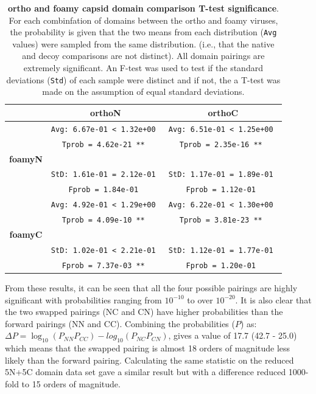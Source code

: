 \documentclass[12pt]{article}
\newcommand{\3}{$3_{10}$}
\begin{document}
\begin{table}
\centering
\begin{tabular}{c|c|c|}
             &          {\bf orthoN}           &          {\bf orthoC}           \\
\hline \hline
             & {\tt Avg: 6.67e-01 < 1.32e+00 } & {\tt Avg: 6.51e-01 < 1.25e+00 } \\
             & {\tt Tprob = 4.62e-21 **      } & {\tt Tprob = 2.35e-16 **      } \\
{\bf foamyN} &                                 &                                 \\
             & {\tt StD: 1.61e-01 = 2.12e-01 } & {\tt StD: 1.17e-01 = 1.89e-01 } \\
             & {\tt Fprob = 1.84e-01         } & {\tt Fprob = 1.12e-01         } \\
\hline
             & {\tt Avg: 4.92e-01 < 1.29e+00 } & {\tt Avg: 6.22e-01 < 1.30e+00 } \\
             & {\tt Tprob = 4.09e-10 **      } & {\tt Tprob = 3.81e-23 **      } \\
{\bf foamyC} &                                 &                                 \\
             & {\tt StD: 1.02e-01 < 2.21e-01 } & {\tt StD: 1.12e-01 = 1.77e-01 } \\
             & {\tt Fprob = 7.37e-03 **      } & {\tt Fprob = 1.20e-01         } \\
\hline \hline
\end{tabular}
\begin{footnotesize}
\caption{
\label{Tab:Ttest}
{\bf ortho and foamy capsid domain comparison T-test significance}.
For each combinfation of domains between the ortho and foamy viruses, the probability
is given that the two means from each distribution ({\tt Avg} values) were sampled
from the same distribution.  (i.e., that the native and decoy comparisons are
not distinct).   All domain pairings are extremely significant.   An F-test was used to
test if the standard deviations ({\tt Std}) of each sample were distinct and if not,
the a T-test was made on the assumption of equal standard deviations.
}
\end{footnotesize}
\end{table}

From these results, it can be seen that all the four possible pairings are
highly significant with probabilities ranging from $10^{-10}$ to over $10^{-20}$.
It is also clear that the two swapped pairings (NC and CN) have higher probabilities
than the forward pairings (NN and CC).   Combining the probabilities ($P$) as:
$\Delta P = \log_{10}(P_{NN} P_{CC}) - log_{10}(P_{NC} P_{CN})$,
gives a value of 17.7 (42.7 - 25.0) which means that the swapped pairing is almost 18
orders of magnitude less likely than the forward pairing.
Calculating the same statistic on the reduced 5N+5C domain data set gave a similar result
but with a difference reduced 1000-fold to 15 orders of magnitude.
\end{document}
